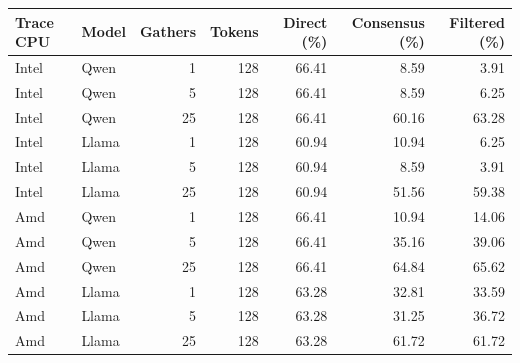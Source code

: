 \begin{tabular}{llrrrrr}
\hline
Trace CPU & Model & Gathers & Tokens & Direct (\%) & Consensus (\%) & Filtered (\%) \\
\hline
Intel & Qwen & 1 & 128 & 66.41 & 8.59 & 3.91 \\
Intel & Qwen & 5 & 128 & 66.41 & 8.59 & 6.25 \\
Intel & Qwen & 25 & 128 & 66.41 & 60.16 & 63.28 \\
Intel & Llama & 1 & 128 & 60.94 & 10.94 & 6.25 \\
Intel & Llama & 5 & 128 & 60.94 & 8.59 & 3.91 \\
Intel & Llama & 25 & 128 & 60.94 & 51.56 & 59.38 \\
Amd & Qwen & 1 & 128 & 66.41 & 10.94 & 14.06 \\
Amd & Qwen & 5 & 128 & 66.41 & 35.16 & 39.06 \\
Amd & Qwen & 25 & 128 & 66.41 & 64.84 & 65.62 \\
Amd & Llama & 1 & 128 & 63.28 & 32.81 & 33.59 \\
Amd & Llama & 5 & 128 & 63.28 & 31.25 & 36.72 \\
Amd & Llama & 25 & 128 & 63.28 & 61.72 & 61.72 \\
\hline
\end{tabular}
